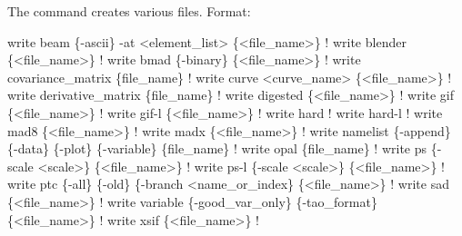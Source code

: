 {{{{{{{{{The  command creates various files.
Format:
\begin{example}
  write beam \{-ascii\} -at <element_list> \{<file_name>\}                    ! 
  write blender \{<file_name>\}                                             ! 
  write bmad \{-binary\} \{<file_name>\}                                      ! 
  write covariance_matrix \{file_name\}                                     ! 
  write curve <curve_name> \{<file_name>\}                                  ! 
  write derivative_matrix \{file_name\}                                     ! 
  write digested \{<file_name>\}                                            ! 
  write gif \{<file_name>\}                                                 ! 
  write gif-l \{<file_name>\}                                               ! 
  write hard                                                              ! 
  write hard-l                                                            ! 
  write mad8 \{<file_name>\}                                                ! 
  write madx \{<file_name>\}                                                ! 
  write namelist \{-append\} \{-data\} \{-plot\} \{-variable\} \{file_name\}        ! 
  write opal \{file_name\}                                                  ! 
  write ps \{-scale <scale>\} \{<file_name>\}                                 !   
  write ps-l \{-scale <scale>\} \{<file_name>\}                               ! 
  write ptc \{-all\} \{-old\} \{-branch <name_or_index\} \{<file_name>\}          ! 
  write sad \{<file_name>\}                                                 ! 
  write variable \{-good_var_only\} \{-tao_format\} \{<file_name>\}               ! 
  write xsif \{<file_name>\}                                                ! 
\end{example}



}}}}}}}}}
